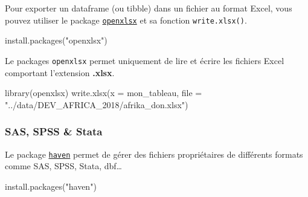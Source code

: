 \documentclass[
  letterpaper,
  DIV=11,
  numbers=noendperiod]{scrartcl}
\newenvironment{Shaded}{\begin{snugshade}}{\end{snugshade}}
\newcommand{\AttributeTok}[1]{\textcolor[rgb]{0.40,0.45,0.13}{#1}}
\newcommand{\FunctionTok}[1]{\textcolor[rgb]{0.28,0.35,0.67}{#1}}
\newcommand{\NormalTok}[1]{\textcolor[rgb]{0.00,0.23,0.31}{#1}}
\newcommand{\StringTok}[1]{\textcolor[rgb]{0.13,0.47,0.30}{#1}}
\begin{document}
Pour exporter un dataframe (ou tibble) dans un fichier au format Excel,
vous pouvez utiliser le package
\href{https://cran.r-project.org/web/packages/openxlsx/index.html}{\texttt{openxlsx}}
et sa fonction \texttt{write.xlsx()}.

\begin{Shaded}
\begin{Highlighting}[]
\FunctionTok{install.packages}\NormalTok{(}\StringTok{"openxlsx"}\NormalTok{)}
\end{Highlighting}
\end{Shaded}

\begin{tcolorbox}[enhanced jigsaw, colframe=quarto-callout-important-color-frame, bottomtitle=1mm, colback=white, leftrule=.75mm, breakable, left=2mm, titlerule=0mm, toptitle=1mm, arc=.35mm, title=\textcolor{quarto-callout-important-color}{\faExclamation}\hspace{0.5em}{Important}, rightrule=.15mm, bottomrule=.15mm, toprule=.15mm, colbacktitle=quarto-callout-important-color!10!white, opacitybacktitle=0.6, opacityback=0, coltitle=black]

Le packages \texttt{openxlsx} permet uniquement de lire et écrire les
fichiers Excel comportant l'extension \textbf{.xlsx}.

\end{tcolorbox}

\begin{Shaded}
\begin{Highlighting}[]
\FunctionTok{library}\NormalTok{(openxlsx)}
\FunctionTok{write.xlsx}\NormalTok{(}\AttributeTok{x =}\NormalTok{ mon\_tableau, }\AttributeTok{file =} \StringTok{"../data/DEV\_AFRICA\_2018/afrika\_don.xlsx"}\NormalTok{)}
\end{Highlighting}
\end{Shaded}

\hfill\break

\hypertarget{sas-spss-stata}{%
\subsubsection{SAS, SPSS \& Stata}\label{sas-spss-stata}}

Le package \href{https://haven.tidyverse.org/}{\texttt{haven}} permet de
gérer des fichiers propriétaires de différents formats comme SAS, SPSS,
Stata, dbf\ldots{}

\begin{Shaded}
\begin{Highlighting}[]
\FunctionTok{install.packages}\NormalTok{(}\StringTok{"haven"}\NormalTok{)}
\end{Highlighting}
\end{Shaded}
\end{document}
